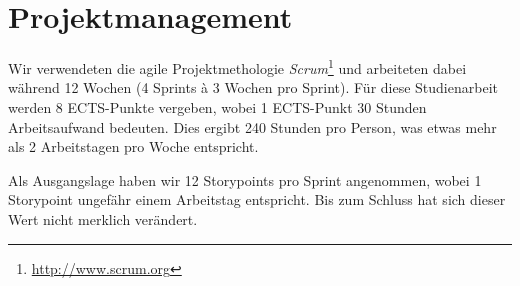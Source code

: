 \chapter{Projektmanagement}
\label{projektmanagement}

Wir verwendeten die agile Projektmethologie \emph{Scrum}\footnote{\url{http://www.scrum.org}} und arbeiteten dabei während 12 Wochen (4 Sprints à 3 Wochen pro Sprint).
Für diese Studienarbeit werden 8 ECTS-Punkte vergeben, wobei 1 ECTS-Punkt 30 Stunden Arbeitsaufwand bedeuten.
Dies ergibt 240 Stunden pro Person, was etwas mehr als 2 Arbeitstagen pro Woche entspricht.

Als Ausgangslage haben wir 12 Storypoints pro Sprint angenommen, wobei 1 Storypoint ungefähr einem Arbeitstag entspricht. Bis zum Schluss hat sich dieser Wert nicht merklich verändert.









